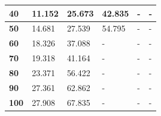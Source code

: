 \begin{table}[H]
\begin{tabular}{|l|l|l|l|l|l|}
\textbf{40}                               & 11.152          & 25.673           & 42.835           & -                & -                \\ \hline
\textbf{50}                               & 14.681          & 27.539           & 54.795           & -                & -                \\ \hline
\textbf{60}                               & 18.326          & 37.088           & -                & -                & -                \\ \hline
\textbf{70}                               & 19.318          & 41.164           & -                & -                & -                \\ \hline
\textbf{80}                               & 23.371          & 56.422           & -                & -                & -                \\ \hline
\textbf{90}                               & 27.361          & 62.862           & -                & -                & -                \\ \hline
\textbf{100}                              & 27.908          & 67.835           & -                & -                & -                \\ \hline
\end{tabular}
\end{table}

